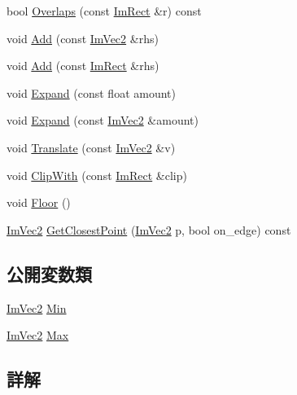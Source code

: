 \begin{DoxyCompactItemize}
\item 
bool \mbox{\hyperlink{struct_im_rect_a0af3bade3781e5e7c6afdf71ccfb0d43}{Overlaps}} (const \mbox{\hyperlink{struct_im_rect}{Im\+Rect}} \&r) const
\item 
void \mbox{\hyperlink{struct_im_rect_a9d6cbef8c86ca01a16bb0fd35b457f88}{Add}} (const \mbox{\hyperlink{struct_im_vec2}{Im\+Vec2}} \&rhs)
\item 
void \mbox{\hyperlink{struct_im_rect_a9bcb65fd17843c74555291a522e9ebdf}{Add}} (const \mbox{\hyperlink{struct_im_rect}{Im\+Rect}} \&rhs)
\item 
void \mbox{\hyperlink{struct_im_rect_af33a7424c3341d08acd69da30c27c753}{Expand}} (const float amount)
\item 
void \mbox{\hyperlink{struct_im_rect_ac0b0b88fe65725b4694cd7d91d42d382}{Expand}} (const \mbox{\hyperlink{struct_im_vec2}{Im\+Vec2}} \&amount)
\item 
void \mbox{\hyperlink{struct_im_rect_ae964217d0317002b1ae80f935c97e689}{Translate}} (const \mbox{\hyperlink{struct_im_vec2}{Im\+Vec2}} \&v)
\item 
void \mbox{\hyperlink{struct_im_rect_a5e220ababe2fa079638aab8f4b0b8ace}{Clip\+With}} (const \mbox{\hyperlink{struct_im_rect}{Im\+Rect}} \&clip)
\item 
void \mbox{\hyperlink{struct_im_rect_a8fdf75a0c64ff29f65113cd9f8be77ab}{Floor}} ()
\item 
\mbox{\hyperlink{struct_im_vec2}{Im\+Vec2}} \mbox{\hyperlink{struct_im_rect_a223c67d4c93e5c87a33a68ebb527bbb8}{Get\+Closest\+Point}} (\mbox{\hyperlink{struct_im_vec2}{Im\+Vec2}} p, bool on\+\_\+edge) const
\end{DoxyCompactItemize}
\subsection*{公開変数類}
\begin{DoxyCompactItemize}
\item 
\mbox{\hyperlink{struct_im_vec2}{Im\+Vec2}} \mbox{\hyperlink{struct_im_rect_af8f3fbf7ec983e03548b88e14ba68aa8}{Min}}
\item 
\mbox{\hyperlink{struct_im_vec2}{Im\+Vec2}} \mbox{\hyperlink{struct_im_rect_aad58c13340d320b350a72a037e3f7628}{Max}}
\end{DoxyCompactItemize}


\subsection{詳解}


